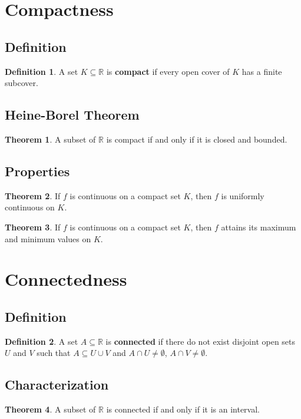 \documentclass[11pt]{article}
\theoremstyle{definition}
\newtheorem{definition}{Definition}[section]
\newtheorem{theorem}{Theorem}[section]
\begin{document}
\section{Compactness}

\subsection{Definition}
\begin{definition}
A set $K \subseteq \mathbb{R}$ is \textbf{compact} if every open cover of $K$ has a finite subcover.
\end{definition}

\subsection{Heine-Borel Theorem}
\begin{theorem}
A subset of $\mathbb{R}$ is compact if and only if it is closed and bounded.
\end{theorem}

\subsection{Properties}
\begin{theorem}
If $f$ is continuous on a compact set $K$, then $f$ is uniformly continuous on $K$.
\end{theorem}

\begin{theorem}
If $f$ is continuous on a compact set $K$, then $f$ attains its maximum and minimum values on $K$.
\end{theorem}

\section{Connectedness}

\subsection{Definition}
\begin{definition}
A set $A \subseteq \mathbb{R}$ is \textbf{connected} if there do not exist disjoint open sets $U$ and $V$ such that $A \subseteq U \cup V$ and $A \cap U \neq \emptyset$, $A \cap V \neq \emptyset$.
\end{definition}

\subsection{Characterization}
\begin{theorem}
A subset of $\mathbb{R}$ is connected if and only if it is an interval.
\end{theorem}
\end{document}
